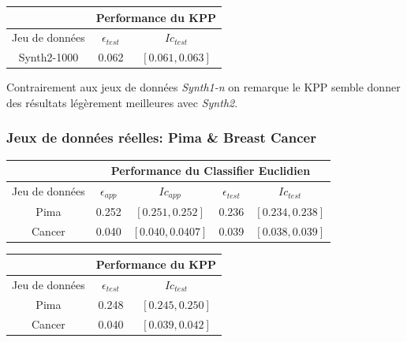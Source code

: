\documentclass[10pt]{article}
\begin{document}
		
		\begin{center}		
			\begin{tabular}{ | c | c | c |}
				\rowcolor{lightgray} 
				&  \multicolumn{2}{|c|}{Performance du KPP}\\
				
				\hline
				Jeu de données &   $\epsilon_{test}$ &  $Ic_{test}$\\
				\hline
				\multirow{1}{*}{Synth2-1000}       &0.062   & $[ 0.061, 0.063]$ 			 \\
				\hline
			\end{tabular}
		\end{center}
				Contrairement aux jeux de données \textit{Synth1-n} on remarque le KPP semble donner des résultats légèrement meilleures avec \textit{Synth2}.
				\subsubsection{ Jeux de données réelles: Pima \& Breast Cancer}
				
			
				
				
				\begin{center}		
				\begin{tabular}{ | c | c | c || c | c |}
					\rowcolor{lightgray} 
					&  \multicolumn{4}{c||}{ Performance du Classifier Euclidien}  \\
					\hline
					Jeu de données &   $\epsilon_{app}$ & $Ic_{app}$ & $\epsilon_{test}$ & $Ic_{test}$\\
					\hline
					\multirow{1}{*}{Pima}     &     0.252   & $[0.251, 0.252]$		&0.236     &		$[0.234, 0.238 ]$	 \\
					\hline
					\multirow{1}{*}{Cancer}     &    0.040   & $[0.040, 0.0407]$& 0.039    &		$[0.038, 0.039]$	 \\
					\hline
					
				\end{tabular}
			\end{center}
				
				
					\begin{center}		
					\begin{tabular}{ | c | c | c |}
						\rowcolor{lightgray} 
						&  \multicolumn{2}{|c|}{Performance du KPP}\\
						
						\hline
						Jeu de données &   $\epsilon_{test}$ &  $Ic_{test}$\\
						\hline
						\multirow{1}{*}{Pima}       & 0.248 & $[0.245, 0.250]$ 			 \\
						\hline
							\multirow{1}{*}{Cancer}       &0.040    & $[0.039, 0.042]$ 			 \\
						\hline
					\end{tabular}
				\end{center}
				
\end{document}

